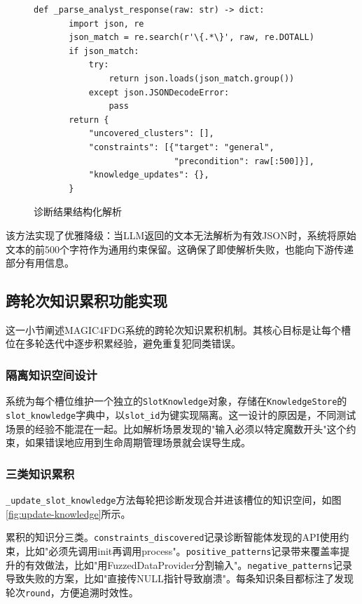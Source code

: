 \begin{figure}[H]
    \centering
    \begin{lstlisting}[style=style@python]
   def _parse_analyst_response(raw: str) -> dict:
       import json, re
       json_match = re.search(r'\{.*\}', raw, re.DOTALL)
       if json_match:
           try:
               return json.loads(json_match.group())
           except json.JSONDecodeError:
               pass
       return {
           "uncovered_clusters": [],
           "constraints": [{"target": "general",
                            "precondition": raw[:500]}],
           "knowledge_updates": {},
       }
    \end{lstlisting}
    \caption{诊断结果结构化解析}
    \label{fig:parse-analyst}
\end{figure}

该方法实现了优雅降级：当LLM返回的文本无法解析为有效JSON时，系统将原始文本的前500个字符作为通用约束保留。这确保了即使解析失败，也能向下游传递部分有用信息。

\subsection{跨轮次知识累积功能实现}

这一小节阐述MAGIC4FDG系统的跨轮次知识累积机制。其核心目标是让每个槽位在多轮迭代中逐步积累经验，避免重复犯同类错误。

\subsubsection{隔离知识空间设计}

系统为每个槽位维护一个独立的\texttt{SlotKnowledge}对象，存储在\texttt{KnowledgeStore}的\texttt{slot\_knowledge}字典中，以\texttt{slot\_id}为键实现隔离。这一设计的原因是，不同测试场景的经验不能混在一起。比如解析场景发现的"输入必须以特定魔数开头"这个约束，如果错误地应用到生命周期管理场景就会误导生成。

\subsubsection{三类知识累积}

\texttt{\_update\_slot\_knowledge}方法每轮把诊断发现合并进该槽位的知识空间，如图\ref{fig:update-knowledge}所示。

累积的知识分三类。\texttt{constraints\_discovered}记录诊断智能体发现的API使用约束，比如"必须先调用init再调用process"。\texttt{positive\_patterns}记录带来覆盖率提升的有效做法，比如"用FuzzedDataProvider分割输入"。\texttt{negative\_patterns}记录导致失败的方案，比如"直接传NULL指针导致崩溃"。每条知识条目都标注了发现轮次\texttt{round}，方便追溯时效性。

